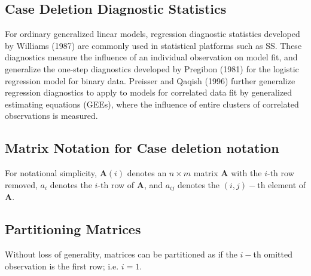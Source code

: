 \subsection{Case Deletion Diagnostic Statistics}

For ordinary generalized linear models, regression diagnostic statistics developed by Williams (1987) are commonly used in statistical platforms such as SS. These diagnostics measure the influence of an individual observation on model fit, and generalize the one-step diagnostics developed by Pregibon (1981) for the logistic regression model for binary data.
Preisser and Qaqish (1996) further generalize regression diagnostics to apply to models for correlated data fit by generalized estimating equations (GEEs), where the influence of entire clusters of correlated observations is measured.


\subsection{Matrix Notation for  Case deletion notation} %

For notational simplicity, $\boldsymbol{A}(i)$ denotes an $n \times m$ matrix $\boldsymbol{A}$ with the $i$-th row
removed, $a_i$ denotes the $i$-th row of $\boldsymbol{A}$, and $a_{ij}$ denotes the $(i, j)-$th element of $\boldsymbol{A}$.

\subsection{Partitioning Matrices} %
Without loss of generality, matrices can be partitioned as if the $i-$th omitted observation is the first row; i.e. $i=1$.
